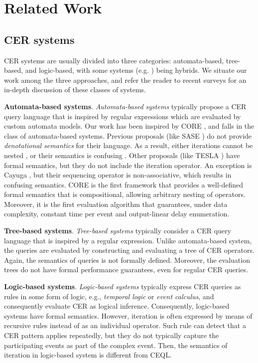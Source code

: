 \chapter{Related Work}\label{chapter:related_work}

\section{CER systems}\label{sec:cer-systems}

CER systems are usually divided into three categories:  automata-based, tree-based, and logic-based, with some systems (e.g. \cite{esper, tesla}) being hybrids. We situate our work among the three approaches, and refer the reader to recent surveys \cite{survey-systems-1,survey-systems-2,research-evaluation-query} for an in-depth discussion of these classes of systems.

\textbf{Automata-based systems}. \emph{Automata-based systems} typically propose a CER query language that is inspired by regular expressions which are evaluated by custom automata models. Our work has been inspired by CORE \cite{core}, and falls in the class of automata-based systems. Previous proposals (like SASE \cite{sase}) do not provide \emph{denotational semantics} for their language. As a result, either iterations cannot be nested \cite{skip-till-any-match}, or their semantics is confusing \cite{next-cep}. Other proposals (like TESLA \cite{tesla}) have formal semantics, but they do not include the iteration operator. An exception is Cayuga \cite{cayuga},  but their sequencing operator is non-associative, which results in confusing semantics. CORE \cite{core} is the first framework that provides a well-defined formal semantics that is compositional, allowing arbitrary nesting of operators. Moreover, it is the first evaluation algorithm that guarantees, under data complexity, constant time per event and output-linear delay enumeration.

\textbf{Tree-based systems}. \emph{Tree-based systems} \cite{esper, tree-based-system-1, tree-based-system-2} typically consider a CER query language that is inspired by a regular expression. Unlike automata-based system, the queries are evaluated by constructing and evaluating a tree of CER operators. Again, the semantics of queries is not formally defined. Moreover, the evaluation trees do not have formal performance guarantees, even for regular CER queries.

\textbf{Logic-based systems}. \emph{Logic-based systems} \cite{logic-based-system-1, logic-based-system-2, logic-based-system-3} typically express CER queries as rules in some form of logic, e.g., \emph{temporal logic} or \emph{event calculus}, and consequently evaluate CER as logical inference. Consequently, logic-based systems have formal semantics. However, iteration is often expressed by means of recursive rules instead of as an individual operator. Such rule can detect that a CER pattern applies repeatedly, but they do not typically capture the participating events as part of the complex event. Then, the semantics of iteration in logic-based system is different from CEQL.

